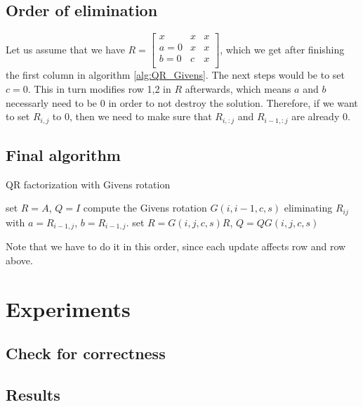 \documentclass[a4paper]{scrartcl}
\begin{document}
    \subsection{Order of elimination}\label{sub:ElimOrder}

    Let us assume that we have
    $R= \begin{bmatrix}
        x & x & x \\
        a=0 & x & x \\
        b=0 & c & x \\
    \end{bmatrix}$, which we get after finishing the first column in
    algorithm \ref{alg:QR_Givens}. The next steps would be to set $c=0$.
    This in turn modifies row 1,2 in $R$ afterwards, which means $a$ and
    $b$ necessarly need to be 0 in order to not destroy the solution.
    Therefore, if we want to set $R_{i,j}$ to 0, then we need to make
    sure that $R_{i, :j}$ and $R_{i-1, :j}$ are already 0.

    \subsection{Final algorithm}
        \begin{algorithm}[H]
            \caption{QR factorization with Givens rotation}\label{alg:QR_Givens}
            \begin{algorithmic}[1]
            \State set $R=A$, $Q=I$
                    \State compute the Givens rotation $G(i,i-1,c,s)$ eliminating $R_{ij}$ with $a=R_{i-1,j}$, $b=R_{i-1,j}$.
                    \State set $R=G(i,j,c,s) R$, $Q = Q G(i,j,c,s)$
                \EndFor
            \EndFor
            \EndProcedure
            \end{algorithmic}
        \end{algorithm}

        Note that we have to do it in this order, since each update affects row and row above.

\section{Experiments}
    \subsection{Check for correctness}
    \subsection{Results}
\end{document}
